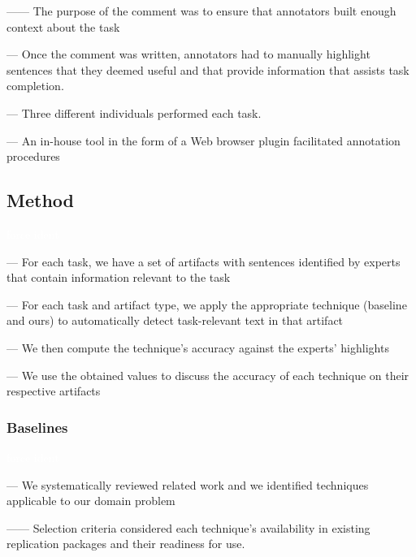 ------ The purpose of the comment was to ensure that annotators built enough context about the task \vspace{3mm}

--- Once the comment was written,  annotators had to manually highlight sentences that they deemed useful and that provide information that assists task completion.

--- Three different individuals performed each task. \vspace{3mm}

--- An in-house tool in the form of a Web browser plugin facilitated annotation procedures

\subsection{Method}
\textcolor{white}{force ident} %


--- For each task, we have a set of artifacts with sentences identified by experts that contain information relevant to the task \vspace{3mm}

--- For each task and artifact type, we apply the appropriate technique (baseline and ours) to automatically detect task-relevant text in that artifact


--- We then compute the technique's accuracy against the experts' highlights 

--- We use the obtained values to discuss the accuracy of each technique on their respective artifacts



\subsubsection{Baselines}
\label{cp4:comparison-techniques}
\textcolor{white}{force ident} %

--- We systematically reviewed related work and we identified techniques applicable to our domain problem

------ Selection criteria considered each technique's availability in existing replication packages and their readiness for use.

